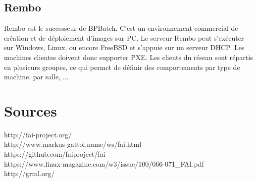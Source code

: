 \documentclass[a4paper,12pt,one side,titlepage]{report}
\begin{document}
\section{Rembo}
Rembo est le successeur de BPBatch. C’est un environnement commercial de création et de déploiement d’images sur PC. Le serveur Rembo peut s’exécuter sur Windows, Linux, ou encore FreeBSD et s’appuie sur un serveur DHCP. Les machines clientes doivent donc supporter PXE. Les clients du réseau sont répartis en plusieurs groupes, ce qui permet de définir des comportements par type de machine, par salle, ... 

\chapter{Sources}
http://fai-project.org/\\
http://www.markus-gattol.name/ws/fai.html\\
https://github.com/faiproject/fai\\
https://www.linux-magazine.com/w3/issue/100/066-071\_FAI.pdf\\
http://grml.org/\\
\end{document}
